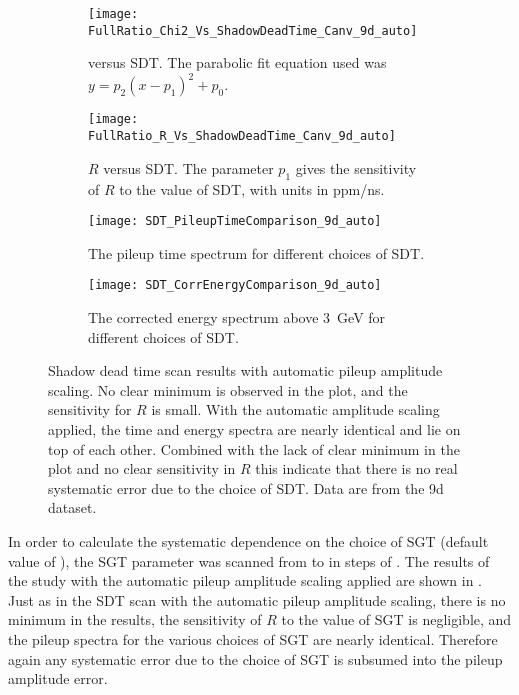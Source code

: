 \begin{figure}
\centering
    \begin{subfigure}[t]{0.45\textwidth}
        \centering
        \texttt{[image: FullRatio\_Chi2\_Vs\_ShadowDeadTime\_Canv\_9d\_auto]}
        \caption{\chisq versus SDT. The parabolic fit equation used was $y = p_{2}(x - p_{1})^{2} + p_{0}.$}
    \end{subfigure}%
    \hspace{1cm}
    \begin{subfigure}[t]{0.45\textwidth}
        \centering
        \texttt{[image: FullRatio\_R\_Vs\_ShadowDeadTime\_Canv\_9d\_auto]}
        \caption{$R$ versus SDT. The parameter $p_{1}$ gives the sensitivity of $R$ to the value of SDT, with units in ppm/ns.}
    \end{subfigure}

    \begin{subfigure}[t]{0.45\textwidth}
        \centering
        \texttt{[image: SDT\_PileupTimeComparison\_9d\_auto]}
        \caption{The pileup time spectrum for different choices of SDT.}
    \end{subfigure}%
    \hspace{1cm}
    \begin{subfigure}[t]{0.45\textwidth}
        \centering
        \texttt{[image: SDT\_CorrEnergyComparison\_9d\_auto]}
        \caption{The corrected energy spectrum above \SI{3}{\GeV} for different choices of SDT.}
    \end{subfigure}
\caption[Pileup shadow dead time scan with automatic pileup amplitude scaling]{Shadow dead time scan results with automatic pileup amplitude scaling. No clear minimum is observed in the \chisq plot, and the sensitivity for $R$ is small. With the automatic amplitude scaling applied, the time and energy spectra are nearly identical and lie on top of each other. Combined with the lack of clear minimum in the \chisq plot and no clear sensitivity in $R$ this indicate that there is no real systematic error due to the choice of SDT. Data are from the 9d dataset.}
\label{fig:SDTscan_autoScaling}
\end{figure}


In order to calculate the systematic dependence on the choice of SGT (default value of ), the SGT parameter was scanned from  to  in steps of . The results of the study with the automatic pileup amplitude scaling applied are shown in . Just as in the SDT scan with the automatic pileup amplitude scaling, there is no minimum in the \chisq results, the sensitivity of $R$ to the value of SGT is negligible, and the pileup spectra for the various choices of SGT are nearly identical. Therefore again any systematic error due to the choice of SGT is subsumed into the pileup amplitude error.



